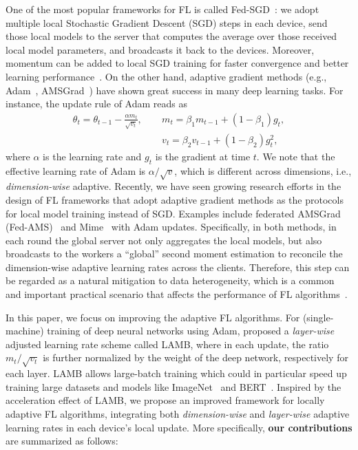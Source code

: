 \documentclass[nohyperref]{article}
\theoremstyle{plain}
\theoremstyle{definition}
\theoremstyle{remark}
\begin{document}
One of the most popular frameworks for FL is called Fed-SGD~\citep{mcmahan2017communication}: we adopt multiple local Stochastic Gradient Descent (SGD) steps in each device, send those local models to the server that computes the average over those received local model parameters, and broadcasts it back to the devices. Moreover, momentum can be added to local SGD training for faster convergence and better learning performance~\citep{Proc:YuJY_ICML19}. On the other hand, adaptive gradient methods (e.g., Adam~\citep{KB15}, AMSGrad~\cite{reddi2019convergence}) have shown great success in many deep learning tasks. For instance, the update rule of Adam reads as
\begin{equation}\label{rule:adam}
    \begin{aligned}
       \theta_t=\theta_{t-1}-\frac{\alpha m_t}{\sqrt{v_t}},\ \quad &m_t=\beta_1 m_{t-1}+(1-\beta_1) g_t,\\
       & v_t=\beta_2 v_{t-1}+(1-\beta_2) g_t^2,
    \end{aligned}
\end{equation}
where $\alpha$ is the learning rate and $g_t$ is the gradient at time $t$. 
We note that the effective learning rate of Adam is $\alpha/\sqrt{v}$, which is different across dimensions, i.e., \textit{dimension-wise} adaptive. Recently, we have seen growing research efforts in the design of FL frameworks that adopt adaptive gradient methods as the protocols for local model training instead of SGD. 
Examples include federated AMSGrad (Fed-AMS)~\cite{chen2020toward} and Mime~\cite{karimireddy2020mime} with Adam updates. 
Specifically, in both methods, in each round the global server not only aggregates the local models, but also broadcasts to the workers a ``global'' second moment estimation to reconcile the dimension-wise adaptive learning rates across the clients. Therefore, this step can be regarded as a natural mitigation to data heterogeneity, which is a common and important practical scenario that affects the performance of FL algorithms~\citep{li2019federated,liang2019variance,karimireddy2019scaffold}.

In this paper, we focus on improving the adaptive FL algorithms. For (single-machine) training of deep neural networks using Adam, \citet{you2019large} proposed a \textit{layer-wise} adjusted learning rate scheme called LAMB, where in each update, the ratio $m_t/\sqrt{v_t}$ is further normalized by the weight of the deep network, respectively for each layer. 
LAMB allows large-batch training which could in particular speed up training large datasets and models like ImageNet~\cite{deng2009imagenet} and BERT~\cite{bert19}. Inspired by the acceleration effect of LAMB, we propose an improved framework for locally adaptive FL algorithms, integrating both \emph{dimension-wise} and \emph{layer-wise} adaptive learning rates in each device's local update. More specifically, \textbf{our contributions} are summarized as follows:
\end{document}
